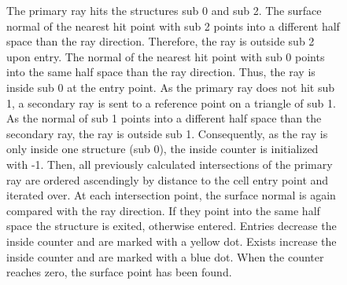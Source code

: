 \begin{figure}
{		The primary ray hits the structures sub 0 and sub 2.
		The surface normal of the nearest hit point with sub 2 points into a different half space than the ray direction.
		Therefore, the ray is outside sub 2 upon entry.
		The normal of the nearest hit point with sub 0 points into the same half space than the ray direction.
		Thus, the ray is inside sub 0 at the entry point.
		As the primary ray does not hit sub 1, a secondary ray is sent to a reference point on a triangle of sub 1.
		As the normal of sub 1 points into a different half space than the secondary ray, the ray is outside sub 1.
		Consequently, as the ray is only inside one structure (sub 0), the inside counter is initialized with -1.
		Then, all previously calculated intersections of the primary ray are ordered ascendingly by distance to the cell entry point and iterated over.
		At each intersection point, the surface normal is again compared with the ray direction.
		If they point into the same half space the structure is exited, otherwise entered.
		Entries decrease the inside counter and are marked with a yellow dot.
		Exists increase the inside counter and are marked with a blue dot.
		When the counter reaches zero, the surface point has been found.
	}
	\label{fig:raycast}
\end{figure}

